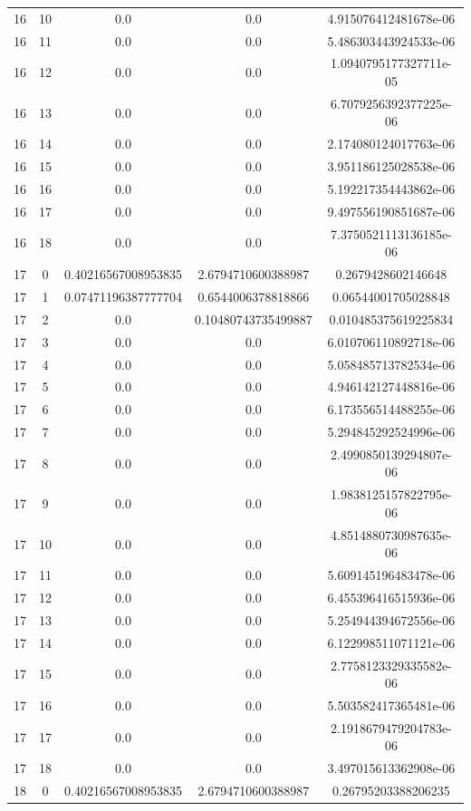 \documentclass{article}
\begin{document}
\begin{table}[h]
\begin{tabular}{|c|c|c|c|c|}
16 & 10 & 0.0 & 0.0 & 4.915076412481678e-06 \\
16 & 11 & 0.0 & 0.0 & 5.486303443924533e-06 \\
16 & 12 & 0.0 & 0.0 & 1.0940795177327711e-05 \\
16 & 13 & 0.0 & 0.0 & 6.7079256392377225e-06 \\
16 & 14 & 0.0 & 0.0 & 2.174080124017763e-06 \\
16 & 15 & 0.0 & 0.0 & 3.951186125028538e-06 \\
16 & 16 & 0.0 & 0.0 & 5.192217354443862e-06 \\
16 & 17 & 0.0 & 0.0 & 9.497556190851687e-06 \\
16 & 18 & 0.0 & 0.0 & 7.3750521113136185e-06 \\
17 & 0 & 0.40216567008953835 & 2.6794710600388987 & 0.2679428602146648 \\
17 & 1 & 0.07471196387777704 & 0.6544006378818866 & 0.06544001705028848 \\
17 & 2 & 0.0 & 0.10480743735499887 & 0.010485375619225834 \\
17 & 3 & 0.0 & 0.0 & 6.010706110892718e-06 \\
17 & 4 & 0.0 & 0.0 & 5.058485713782534e-06 \\
17 & 5 & 0.0 & 0.0 & 4.946142127448816e-06 \\
17 & 6 & 0.0 & 0.0 & 6.173556514488255e-06 \\
17 & 7 & 0.0 & 0.0 & 5.294845292524996e-06 \\
17 & 8 & 0.0 & 0.0 & 2.4990850139294807e-06 \\
17 & 9 & 0.0 & 0.0 & 1.9838125157822795e-06 \\
17 & 10 & 0.0 & 0.0 & 4.8514880730987635e-06 \\
17 & 11 & 0.0 & 0.0 & 5.609145196483478e-06 \\
17 & 12 & 0.0 & 0.0 & 6.455396416515936e-06 \\
17 & 13 & 0.0 & 0.0 & 5.254944394672556e-06 \\
17 & 14 & 0.0 & 0.0 & 6.122998511071121e-06 \\
17 & 15 & 0.0 & 0.0 & 2.7758123329335582e-06 \\
17 & 16 & 0.0 & 0.0 & 5.503582417365481e-06 \\
17 & 17 & 0.0 & 0.0 & 2.1918679479204783e-06 \\
17 & 18 & 0.0 & 0.0 & 3.497015613362908e-06 \\
18 & 0 & 0.40216567008953835 & 2.6794710600388987 & 0.26795203388206235 \\

\end{tabular}
\end{table}
\end{document}
